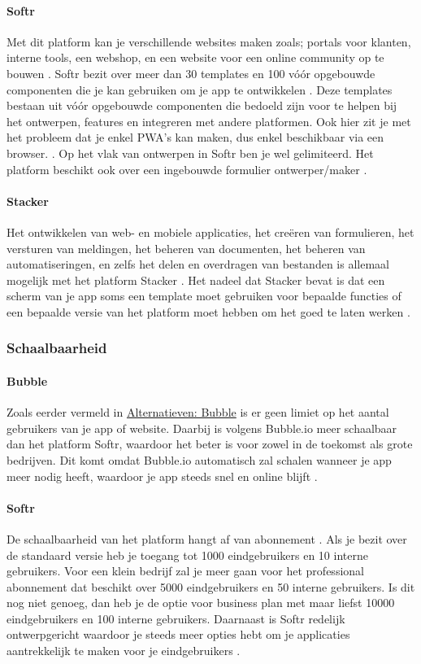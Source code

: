 \paragraph{Softr}
Met dit platform kan je verschillende websites maken zoals; portals voor klanten, interne tools, een webshop, en een website voor een online community op te bouwen\autocite{Code2023} \autocite{Youssef2023} .
Softr bezit over meer dan 30 templates en 100 vóór opgebouwde componenten die je kan gebruiken om je app te 
ontwikkelen \autocite{Frater2024} \autocite{Youssef2023}. 
Deze templates bestaan uit vóór opgebouwde componenten die bedoeld zijn voor te helpen bij het ontwerpen, features en integreren met andere platformen. 
Ook hier zit je met het probleem dat je enkel PWA’s kan maken, dus enkel beschikbaar via een browser. \autocite{Frater2024}. 
Op het vlak van ontwerpen in Softr ben je wel gelimiteerd. Het platform beschikt ook over een ingebouwde formulier ontwerper/maker \autocite{Youssef2023}. 

\paragraph{Stacker}
Het ontwikkelen van web- en mobiele applicaties, het creëren van formulieren, het versturen van meldingen, het beheren van documenten, 
het beheren van automatiseringen, en zelfs het delen en overdragen van bestanden is allemaal mogelijk met het platform 
Stacker \autocite{JDN2023}. 
Het nadeel dat Stacker bevat is dat een scherm van je app soms een template moet gebruiken voor bepaalde functies 
of een bepaalde versie van het platform moet hebben om het goed te laten werken \autocite{Advice}.
\subsubsection*{Schaalbaarheid}
\paragraph{Bubble}
Zoals eerder vermeld in \hyperref[subsec:alternatieve-platformen]{Alternatieven: Bubble} is er geen limiet op het aantal gebruikers van je app of website. Daarbij is volgens \textcite{Youssef2023} 
Bubble.io meer schaalbaar dan het platform Softr, waardoor het beter is voor zowel in de toekomst als grote bedrijven. 
Dit komt omdat Bubble.io automatisch zal schalen wanneer je app meer nodig heeft, 
waardoor je app steeds snel en online blijft \autocite{Bas2024}.
\paragraph{Softr}
De schaalbaarheid van het platform hangt af van abonnement \autocite{Frater2024}. 
Als je bezit over de standaard versie heb je toegang tot 1000 eindgebruikers en 10 interne gebruikers. 
Voor een klein bedrijf zal je meer gaan voor het professional abonnement dat beschikt over 5000 eindgebruikers en 50 interne gebruikers. Is dit nog niet genoeg, 
dan heb je de optie voor business plan met maar liefst 10000 eindgebruikers en 100 interne gebruikers. Daarnaast is Softr redelijk ontwerpgericht waardoor je steeds 
meer opties hebt om je applicaties aantrekkelijk te maken voor je eindgebruikers \autocite{Noloco2023}.
